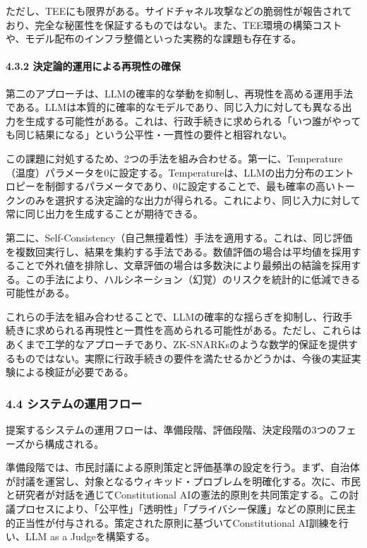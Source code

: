 ただし、TEEにも限界がある。サイドチャネル攻撃などの脆弱性が報告されており、完全な秘匿性を保証するものではない。また、TEE環境の構築コストや、モデル配布のインフラ整備といった実務的な課題も存在する。

\paragraph{4.3.2 決定論的運用による再現性の確保}\label{ux6c7aux5b9aux8ad6ux7684ux904bux7528ux306bux3088ux308bux518dux73feux6027ux306eux78baux4fdd}

第二のアプローチは、LLMの確率的な挙動を抑制し、再現性を高める運用手法である。LLMは本質的に確率的なモデルであり、同じ入力に対しても異なる出力を生成する可能性がある。これは、行政手続きに求められる「いつ誰がやっても同じ結果になる」という公平性・一貫性の要件と相容れない。

この課題に対処するため、2つの手法を組み合わせる。第一に、Temperature（温度）パラメータを0に設定する。Temperatureは、LLMの出力分布のエントロピーを制御するパラメータであり、0に設定することで、最も確率の高いトークンのみを選択する決定論的な出力が得られる。これにより、同じ入力に対して常に同じ出力を生成することが期待できる。

第二に、Self-Consistency（自己無撞着性）手法を適用する。これは、同じ評価を複数回実行し、結果を集約する手法である。数値評価の場合は平均値を採用することで外れ値を排除し、文章評価の場合は多数決により最頻出の結論を採用する。この手法により、ハルシネーション（幻覚）のリスクを統計的に低減できる可能性がある。

これらの手法を組み合わせることで、LLMの確率的な揺らぎを抑制し、行政手続きに求められる再現性と一貫性を高められる可能性がある。ただし、これらはあくまで工学的なアプローチであり、ZK-SNARKsのような数学的保証を提供するものではない。実際に行政手続きの要件を満たせるかどうかは、今後の実証実験による検証が必要である。

\subsubsection{4.4 システムの運用フロー}\label{ux30b7ux30b9ux30c6ux30e0ux306eux904bux7528ux30d5ux30edux30fc}

提案するシステムの運用フローは、準備段階、評価段階、決定段階の3つのフェーズから構成される。

準備段階では、市民討議による原則策定と評価基準の設定を行う。まず、自治体が討議を運営し、対象となるウィキッド・プロブレムを明確化する。次に、市民と研究者が対話を通じてConstitutional AIの憲法的原則を共同策定する。この討議プロセスにより、「公平性」「透明性」「プライバシー保護」などの原則に民主的正当性が付与される。策定された原則に基づいてConstitutional AI訓練を行い、LLM as a Judgeを構築する。

